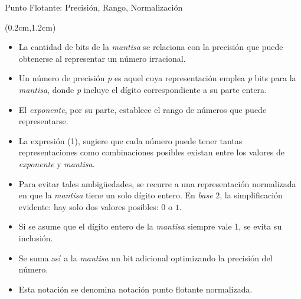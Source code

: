 \begin{frame}{Punto Flotante: Precisión, Rango, Normalización}
 \begin{textblock*}{\textwidth}(0.2cm,1.2cm)
  \begin{itemize} [<+(1)->]\justifying
   \item La cantidad de bits de la \textit{mantisa} se relaciona con la precisión que puede obtenerse al representar un número irracional.
   \item Un número de precisión \textit{p} es aquel cuya representación emplea \textit{p} bits para la \textit{mantisa}, donde \textit{p} incluye el dígito correspondiente a su parte entera.
   \item El \textit{exponente}, por su parte, establece el rango de números que puede representarse.
   \item La expresión (1), sugiere que cada número puede tener tantas representaciones como combinaciones posibles existan entre los valores de \textit{exponente} y \textit{mantisa}.
   \item Para evitar tales ambig\"{u}edades, se recurre a una representación normalizada en que la \textit{mantisa} tiene un solo dígito entero. En \textit{base} 2, la simplificación evidente: hay solo dos valores posibles: $0$ o $1$.
   \item Si se asume que el dígito entero de la \textit{mantisa} siempre vale 1, se evita su inclusión.
   \item Se suma así a la \textit{mantisa} un bit adicional optimizando la precisión del número.
   \item Esta notación se denomina notación punto flotante normalizada.
  \end{itemize}
 \end{textblock*}
\end{frame}

